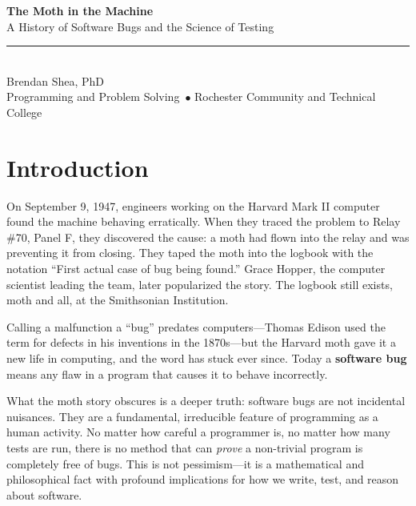 \documentclass[11pt,letterpaper]{article}
\newcommand{\cstitle}{The Moth in the Machine}
\newcommand{\cssubtitle}{A History of Software Bugs and the Science of Testing}
\newcommand{\csauthor}{Brendan Shea, PhD}
\newcommand{\cscourse}{Programming and Problem Solving}
\newcommand{\csinstitution}{Rochester Community and Technical College}
\newcommand{\keyterm}[1]{\textbf{\textcolor{cssecondary}{#1}}}
\begin{document}
\begin{tcolorbox}[
    enhanced,
    colback=csprimary,
    colframe=csprimary,
    arc=0mm,
    left=10mm, right=10mm, top=8mm, bottom=8mm
]
\begin{center}
    {\huge\bfseries\color{white}\cstitle}\\[3mm]
    {\Large\color{cslight}\cssubtitle}\\[5mm]
    \textcolor{cssecondary}{\rule{0.5\textwidth}{1pt}}\\[5mm]
    {\large\color{white}\csauthor}\\[2mm]
    {\normalsize\color{cslight}\cscourse\ $\bullet$ \csinstitution}
\end{center}
\end{tcolorbox}

\vspace{5mm}

\section*{Introduction}

On September 9, 1947, engineers working on the Harvard Mark II computer found the machine behaving erratically. When they traced the problem to Relay \#70, Panel F, they discovered the cause: a moth had flown into the relay and was preventing it from closing. They taped the moth into the logbook with the notation ``First actual case of bug being found.'' Grace Hopper, the computer scientist leading the team, later popularized the story. The logbook still exists, moth and all, at the Smithsonian Institution.

Calling a malfunction a ``bug'' predates computers---Thomas Edison used the term for defects in his inventions in the 1870s---but the Harvard moth gave it a new life in computing, and the word has stuck ever since. Today a \keyterm{software bug} means any flaw in a program that causes it to behave incorrectly.

What the moth story obscures is a deeper truth: software bugs are not incidental nuisances. They are a fundamental, irreducible feature of programming as a human activity. No matter how careful a programmer is, no matter how many tests are run, there is no method that can \textit{prove} a non-trivial program is completely free of bugs. This is not pessimism---it is a mathematical and philosophical fact with profound implications for how we write, test, and reason about software.
\end{document}
